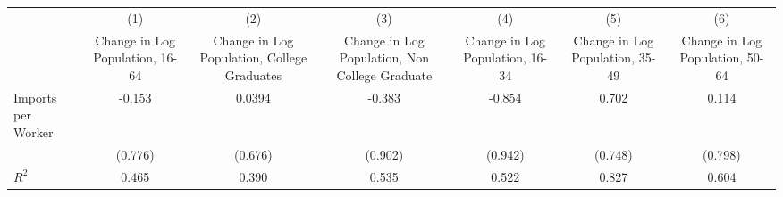 {
\def\sym#1{\ifmmode^{#1}\else\(^{#1}\)\fi}
\begin{tabular}{l*{6}{c}}
\hline\hline
                    &\multicolumn{1}{c}{(1)}&\multicolumn{1}{c}{(2)}&\multicolumn{1}{c}{(3)}&\multicolumn{1}{c}{(4)}&\multicolumn{1}{c}{(5)}&\multicolumn{1}{c}{(6)}\\
                    &\multicolumn{1}{c}{Change in Log Population, 16-64}&\multicolumn{1}{c}{Change in Log Population, College Graduates}&\multicolumn{1}{c}{Change in Log Population, Non College Graduate}&\multicolumn{1}{c}{Change in Log Population, 16-34}&\multicolumn{1}{c}{Change in Log Population, 35-49}&\multicolumn{1}{c}{Change in Log Population, 50-64}\\
\hline
Imports per Worker  &      -0.153   &      0.0394   &      -0.383   &      -0.854   &       0.702   &       0.114   \\
                    &     (0.776)   &     (0.676)   &     (0.902)   &     (0.942)   &     (0.748)   &     (0.798)   \\
\hline
\(R^{2}\)           &       0.465   &       0.390   &       0.535   &       0.522   &       0.827   &       0.604   \\
\hline\hline
\end{tabular}
}
